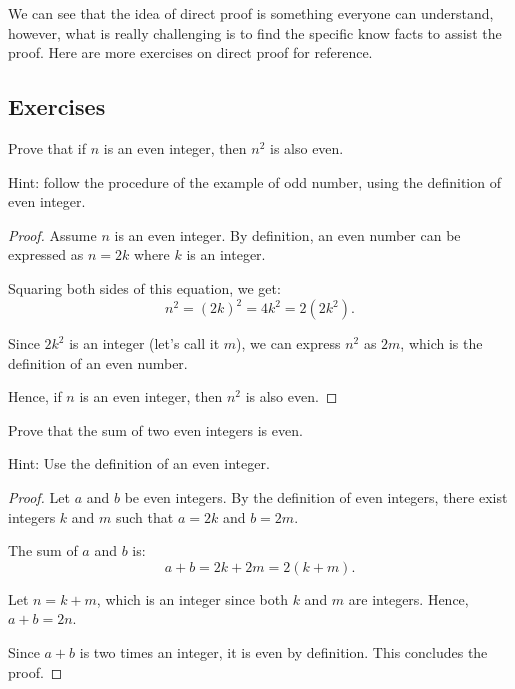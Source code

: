 \documentclass[
	12pt, %
	fleqn, %
	a4paper, %
]{LegrandOrangeBook}
\begin{document}
		We can see that the idea of direct proof is something everyone can understand, however,
		what is really challenging is to find the specific know facts to assist the proof. Here
		are more exercises on direct proof for reference.
        
		\subsection{Exercises}
		\begin{exercise}
			Prove that if \( n \) is an even integer, then \( n^2 \) is also even.
		\end{exercise}
		Hint: follow the procedure of the example of odd number, using the definition of even integer.
		\begin{proof}
        Assume \( n \) is an even integer. By definition, an even number can be expressed as \( n = 2k \) where \( k \) is an integer.
        
        Squaring both sides of this equation, we get:
        \[ n^2 = (2k)^2 = 4k^2 = 2(2k^2). \]
        
        Since \( 2k^2 \) is an integer (let's call it \( m \)), we can express \( n^2 \) as \( 2m \), which is the definition of an even number.
        
        Hence, if \( n \) is an even integer, then \( n^2 \) is also even.
        \end{proof}
        \begin{exercise}
			Prove that the sum of two even integers is even.
		\end{exercise}
		Hint: Use the definition of an even integer.
        \begin{proof}
        Let \( a \) and \( b \) be even integers. By the definition of even integers, there exist integers \( k \) and \( m \) such that \( a = 2k \) and \( b = 2m \).
        
        The sum of \( a \) and \( b \) is:
        \[ a + b = 2k + 2m = 2(k + m). \]
        
        Let \( n = k + m \), which is an integer since both \( k \) and \( m \) are integers. Hence, \( a + b = 2n \).
        
        Since \( a + b \) is two times an integer, it is even by definition. This concludes the proof.
        \end{proof}
		
\end{document}
